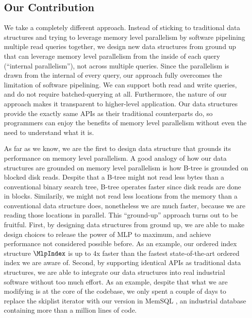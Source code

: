 \documentclass[11pt, usletter]{article}
\begin{document}
\subsection{Our Contribution}

We take a completely different approach. 
Instead of sticking to traditional data structures 
and trying to leverage memory level parallelism by software pipelining multiple read queries together, 
we design new data structures from ground up that can leverage memory level parallelism 
from the inside of each query (``internal parallelism''), not across multiple queries. 
Since the parallelism is drawn from the internal of every query, 
our approach fully overcomes the limitation of software pipelining.
We can support both read and write queries, and do not require batched-querying at all. 
Furthermore, the nature of our approach makes it transparent to higher-level application. 
Our data structures provide the exactly same APIs as their traditional counterparts do, 
so programmers can enjoy the benefits of memory level parallelism without even the need to understand what it is.

As far as we know, we are the first to design data structure that grounds its performance on memory level parallelism.
A good analogy of how our data structures are grounded on memory level parallelism 
is how B-tree is grounded on blocked disk reads. 
Despite that a B-tree might not read less bytes than a conventional binary search tree, 
B-tree operates faster since disk reads are done in blocks. 
Similarily, we might not read less locations from the memory than a conventional data structure does, 
nonetheless we are much faster, because we are reading those locations in parallel.
This ``ground-up'' approach turns out to be fruitful. 
First, by designing data structures from ground up, 
we are able to make design choices to release the power of MLP to maximum, 
and achieve performance not considered possible before. 
As an example, our ordered index structure $\MlpIndex$ is up to 4x faster 
than the fastest state-of-the-art ordered index we are aware of.
Second, by supporting identical APIs as traditional data structures, 
we are able to integrate our data structures into real industrial software 
without too much effort. 
As an example, despite that what we are modifying is at the core of the codebase,
we only spent a couple of days to replace the skiplist iterator with our version in MemSQL \cite{memsql}, 
an industrial database containing more than a million lines of code.
\end{document}
